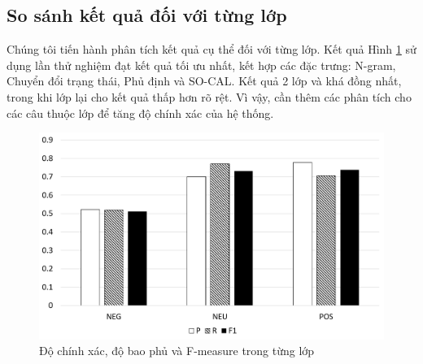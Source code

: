 \subsection*{So sánh kết quả đối với từng lớp}
Chúng tôi tiến hành phân tích kết quả cụ thể đối với từng lớp. Kết quả Hình \ref{fig:p-r-f-class} sử dụng lần thử nghiệm đạt kết quả tối ưu nhất, kết hợp các đặc trưng: N-gram, Chuyển đổi trạng thái, Phủ định và SO-CAL. Kết quả 2 lớp \tichcuc và \trungtinh khá đồng nhất, trong khi lớp \tieucuc lại cho kết quả thấp hơn rõ rệt. Vì vậy, cần thêm các phân tích cho các câu thuộc lớp \tieucuc để tăng độ chính xác của hệ thống.
\begin{figure}[h]
\centering
\includegraphics[scale=0.35]{./hinh/class.png}
\caption{Độ chính xác, độ bao phủ và F-measure trong từng lớp} \label{fig:p-r-f-class}
\end{figure}